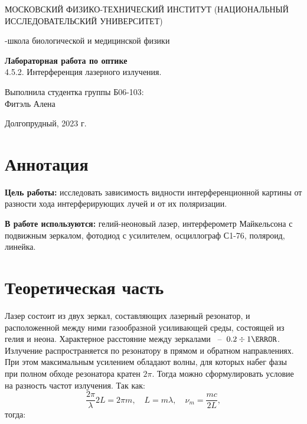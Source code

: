\documentclass[a4paper,12pt]{article}
\begin{document}
\def\figurename{Рисунок}
\begin{titlepage}
\begin{center}
    {\large МОСКОВСКИЙ ФИЗИКО-ТЕХНИЧЕСКИЙ ИНСТИТУТ (НАЦИОНАЛЬНЫЙ ИССЛЕДОВАТЕЛЬСКИЙ УНИВЕРСИТЕТ)}
\end{center}
\begin{center}
    {-школа биологической и медицинской физики}
\end{center}

\vspace{1cm}
{\huge
\begin{center}
    {\bf Лабораторная работа по оптике}\\
    \vspace{0.5cm}
    4.5.2. Интерференция лазерного излучения.
\end{center}
}

\vspace{4cm}
\begin{flushright}
{\LARGE Выполнила студентка группы Б06-103:\\ Фитэль Алена \\}

\end{flushright}
\vspace{9cm}
\begin{center}
    Долгопрудный, 2023 г.
\end{center}
\end{titlepage}
\newpage


\section{Аннотация}

\textbf{Цель работы:} исследовать зависимость видности интерференционной картины от разности хода интерферирующих лучей и от их поляризации.

\textbf{В работе используются:} гелий-неоновый лазер, интерферометр Майкельсона с подвижным зеркалом, фотодиод с усилителем, осциллограф С1-76, поляроид, линейка.

\section{Теоретическая часть}

Лазер состоит из двух зеркал, составляющих лазерный резонатор, и расположенной между ними газообразной усиливающей среды, состоящей из гелия и неона. Характерное расстояние между зеркалами ~--~$0.2 \div 1 \m$. Излучение распространяется по резонатору в прямом и обратном направлениях. При этом максимальным усилением обладают волны, для которых набег фазы при полном обходе резонатора кратен $2 \pi$. Тогда можно сформулировать условие на разность частот излучения. Так как:
\[ \dfrac{2 \pi}{\lambda}2L = 2 \pi m,	\quad L=m\lambda, \quad \nu_{m}=\dfrac{mc}{2L}, \]
тогда:
\end{document}
